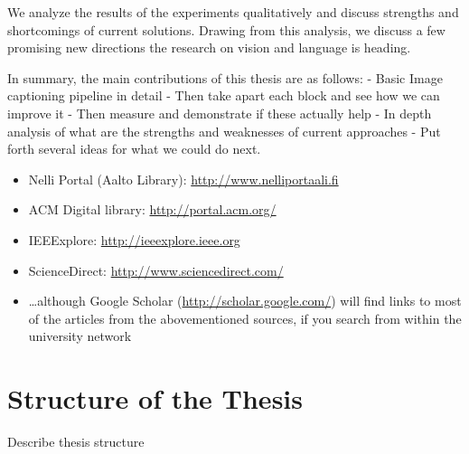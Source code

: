 We analyze the results of the experiments qualitatively and discuss strengths
and shortcomings of current solutions. Drawing from this analysis, we discuss a
few promising new directions the research on vision and language is heading.

In summary, the main contributions of this thesis are as follows:
    - Basic Image captioning pipeline in detail
    - Then take apart each block and see how we can improve it
    - Then measure and demonstrate if these actually help
    - In depth analysis of  what are the strengths and weaknesses of current
    approaches
    - Put forth several ideas for what we could do next.

\begin{itemize}
    \setlength{\itemsep}{0pt}
    \item Nelli Portal (Aalto Library): \url{http://www.nelliportaali.fi}
    \item ACM Digital library: \url{http://portal.acm.org/}
    \item IEEExplore: \url{http://ieeexplore.ieee.org}
    \item ScienceDirect: \url{http://www.sciencedirect.com/}
    \item \ldots although Google Scholar (\url{http://scholar.google.com/}) will
    find links to most of the articles from the abovementioned sources, if you
    search from within the university network
\end{itemize}


\section{Structure of the Thesis}
\label{section:structure} 
Describe thesis structure
